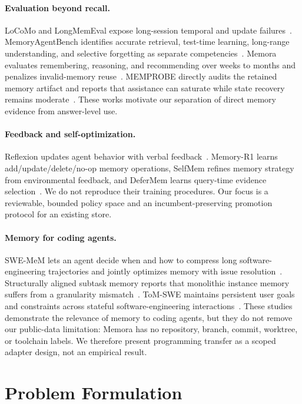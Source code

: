 \documentclass[10pt]{article}
\begin{document}
\paragraph{Evaluation beyond recall.}
LoCoMo and LongMemEval expose long-session temporal and update failures~\cite{maharana2024locomo,wu2024longmemeval}. MemoryAgentBench identifies accurate retrieval, test-time learning, long-range understanding, and selective forgetting as separate competencies~\cite{hu2026memoryagentbench}. Memora evaluates remembering, reasoning, and recommending over weeks to months and penalizes invalid-memory reuse~\cite{uddin2026memora}. MEMPROBE directly audits the retained memory artifact and reports that assistance can saturate while state recovery remains moderate~\cite{ma2026memprobe}. These works motivate our separation of direct memory evidence from answer-level use.

\paragraph{Feedback and self-optimization.}
Reflexion updates agent behavior with verbal feedback~\cite{shinn2023reflexion}. Memory-R1 learns add/update/delete/no-op memory operations, SelfMem refines memory strategy from environmental feedback, and DeferMem learns query-time evidence selection~\cite{yan2025memoryr1,yang2026selfmem,yin2026defermem}. We do not reproduce their training procedures. Our focus is a reviewable, bounded policy space and an incumbent-preserving promotion protocol for an existing store.

\paragraph{Memory for coding agents.}
SWE-MeM lets an agent decide when and how to compress long software-engineering trajectories and jointly optimizes memory with issue resolution~\cite{gao2026swemem}. Structurally aligned subtask memory reports that monolithic instance memory suffers from a granularity mismatch~\cite{shen2026subtaskmemory}. ToM-SWE maintains persistent user goals and constraints across stateful software-engineering interactions~\cite{zhou2026tomswe}. These studies demonstrate the relevance of memory to coding agents, but they do not remove our public-data limitation: Memora has no repository, branch, commit, worktree, or toolchain labels. We therefore present programming transfer as a scoped adapter design, not an empirical result.

\section{Problem Formulation}
\end{document}
